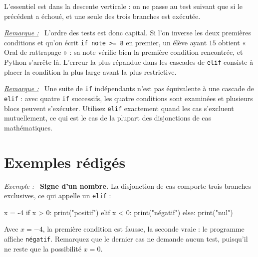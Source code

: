 \documentclass[a4paper,11pt,openany]{book}
\newcommand{\code}[1]{\texttt{\textcolor{codebleu}{#1}}}
\newenvironment{exemple}%
 {\par\vspace{1mm}\begin{list}{}{\leftmargin=1cm \rightmargin=0.5cm}\item[]%
  \textit{Exemple :}~}%
 {\end{list}\vspace{1mm}}
\newenvironment{remarque}%
 {\par\vspace{1mm}\begin{list}{}{\leftmargin=1cm \rightmargin=0.5cm}\item[]%
  \textit{\underline{Remarque :}}~}%
 {\end{list}\vspace{1mm}}
\begin{document}
L'essentiel est dans la descente verticale : on ne passe au test suivant que si le précédent a échoué, et une seule des trois branches est exécutée.

\begin{remarque}
L'ordre des tests est donc capital. Si l'on inverse les deux premières conditions et qu'on écrit \code{if note >= 8} en premier, un élève ayant $15$ obtient « Oral de rattrapage » : sa note vérifie bien la première condition rencontrée, et Python s'arrête là. L'erreur la plus répandue dans les cascades de \code{elif} consiste à placer la condition la plus large avant la plus restrictive.
\end{remarque}

\begin{remarque}
Une suite de \code{if} indépendants n'est pas équivalente à une cascade de \code{elif} : avec quatre \code{if} successifs, les quatre conditions sont examinées et plusieurs blocs peuvent s'exécuter. Utilisez \code{elif} exactement quand les cas s'excluent mutuellement, ce qui est le cas de la plupart des disjonctions de cas mathématiques.
\end{remarque}

\section{Exemples rédigés}

\begin{exemple}
\textbf{Signe d'un nombre.} La disjonction de cas comporte trois branches exclusives, ce qui appelle un \code{elif} :
\begin{python}
x = -4
if x > 0:
    print("positif")
elif x < 0:
    print("négatif")
else:
    print("nul")
\end{python}
Avec $x = -4$, la première condition est fausse, la seconde vraie : le programme affiche \code{négatif}. Remarquez que le dernier cas ne demande aucun test, puisqu'il ne reste que la possibilité $x = 0$.
\end{exemple}
\end{document}
